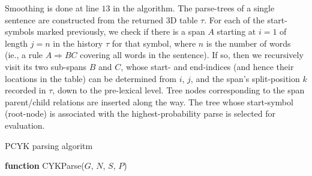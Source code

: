 \documentclass[11pt,twocolumn]{article}
\newcommand{\tbf}{\textbf}
\begin{document}
		Smoothing is done at line $13$ in the algorithm. The parse-trees of a single sentence are constructed
		from the returned 3D table $\tau$. For each of the start-symbols marked previously, we check if there
		is a span $A$ starting at $i=1$ of length $j=n$ in the history $\tau$ for that symbol, where $n$ is the
		number of words (ie., a rule $A \Rightarrow B C$ covering all words in the sentence). If so, then we
		recursively visit its two sub-spans $B$ and $C$, whose start- and end-indices (and hence their locations
		in the table) can be determined from $i$, $j$, and the span's split-position $k$ recorded in $\tau$, down
		to the pre-lexical level. Tree nodes corresponding to the span parent/child relations are inserted along
		the way. The tree whose start-symbol (root-node) is associated with the highest-probability parse is
		selected for evaluation.

		\begin{algorithm}
			\caption{PCYK parsing algoritm}
			\begin{algorithmic}[1]

			\medskip

			\STATE \tbf{function} CYKParse($G$, $N$, $S$, $P$)

					\ELSE
					\ENDIF
				\ENDFOR
			\ENDFOR

							\ENDIF
						\ENDFOR
					\ENDFOR
				\ENDFOR
			\ENDFOR
			\STATE {\tbf{return} $\pi, \tau$}
			\end{algorithmic}
			\label{alg:PCYK}
		\end{algorithm}
\end{document}
